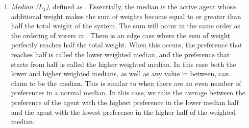 \begin{enumerate}
    \item {
        \textit{Median ($L_1$)}, defined as
        $$.
%
%
%
        Essentially, the median is the active agent whose additional weight makes the
        sum of weights become equal to or greater than half the total weight of the
        system.
        The sum will occur in the same order as the ordering of voters in
        \systemproxies.
        There is an edge case where the sum of weight perfectly reaches half the
        total weight.
        When this occurs, the preference that reaches half is called the lower
        weighted median, and the preference that starts from half is called the higher
        weighted median.
        In this case both the lower and higher weighted medians,
        as well as any value in between, can claim to be the median.
        This is similar to when there are an even number of preferences in a normal
        median.
        In this case, we take the average between the preference of the agent with
        the highest preference in the lower median half and the agent with the lowest
        preference in the higher half of the weighted median.
    }

\end{enumerate}
